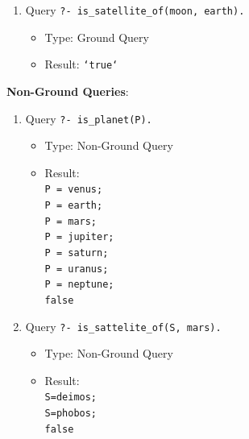 \documentclass[12pt]{article}
\begin{document}
\begin{spacing}{1.5}
\begin{enumerate}
\begin{enumerate}
		      	\item 
		      	      Query \texttt{?- is\_satellite\_of(moon, earth).}
		      	      \begin{itemize}
		      	      	\item Type: Ground Query
		      	      	\item Result: \texttt{`true`}\\
		      	      \end{itemize}
		      \end{enumerate}
		      		      		      		      		      		      		      		      
		      \textbf{Non-Ground Queries}:
		      \begin{enumerate}
 	
		      	\item 
		      	      Query \texttt{?- is\_planet(P).}
		      	      \begin{itemize}
		      	      	\item Type: Non-Ground Query
		      	      	\item Result: \texttt{\\
		      	      		P = venus;\\
		      	      		P = earth;\\
		      	      		P = mars;\\
		      	      		P = jupiter;\\
		      	      		P = saturn;\\
		      	      		P = uranus;\\
		      	      		P = neptune;\\
		      	      	false}
		      	      \end{itemize}
     
		      	\item 
		      	      Query \texttt{?- is\_sattelite\_of(S, mars).}
		      	      \begin{itemize}
		      	      	\item Type: Non-Ground Query
		      	      	\item Result: \texttt{\\
		      	      		S=deimos;\\
		      	      		S=phobos;\\
		      	      	false}
		      	      \end{itemize}
        
		      \end{enumerate}
		      		      		      		      		      		      		      

\end{enumerate}
\end{spacing}
\end{document}
